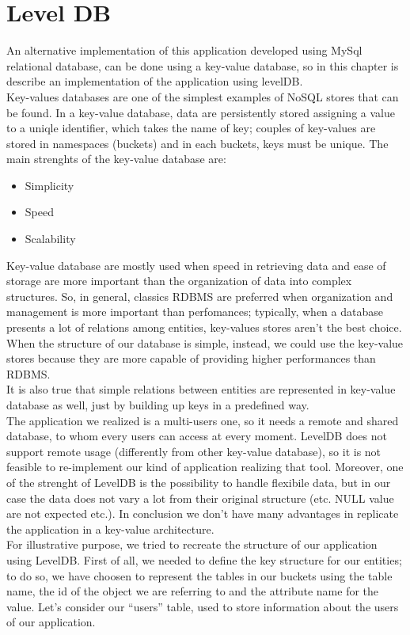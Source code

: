\documentclass[a4paper, oneside]{article}
\begin{document}
\clearpage


\section{Level DB}

An alternative implementation of this application developed using MySql relational database, can be done using a key-value database, so in this chapter is describe an implementation of the application using levelDB.\\
Key-values databases are one of the simplest examples of NoSQL stores that can be found. In a key-value database, data are persistently stored assigning a value to a uniqle identifier, which takes the name of key; couples of key-values are stored in namespaces (buckets) and in each buckets, keys must be unique. The main strenghts of the key-value database are:
\begin{itemize}
\item Simplicity
\item Speed 
\item Scalability
\end{itemize}
Key-value database are mostly used when speed in retrieving data and ease of storage are more important than the organization of data into complex structures. So, in general, classics RDBMS are preferred when organization and management is more important than perfomances; typically, when a database presents a lot of relations among entities, key-values stores aren’t the best choice. When the structure of our database is simple, instead, we could use the key-value stores because they are more capable of providing higher performances than RDBMS.\\
It is also true that simple relations between entities are represented in key-value database as well, just by building up keys in a predefined way.\\
The application we realized is a multi-users one, so it needs a remote and shared database, to whom every users can access at every moment. LevelDB does not support remote usage (differently from other key-value database), so it is not feasible to re-implement our kind of application realizing that tool. Moreover, one of the strenght of LevelDB is the possibility to handle flexibile data, but in our case the data does not vary a lot from their original structure (etc. NULL value are not expected etc.). In conclusion we don’t have many advantages in replicate the application in a key-value architecture.\\
For illustrative purpose, we tried to recreate the structure of our application using LevelDB.
First of all, we needed to define the key structure for our entities; to do so, we have choosen to represent the tables in our buckets using the table name, the id of the object we are referring to and the attribute name for the value.
Let’s consider our “users” table, used to store information about the users of our application.\\
\end{document}
